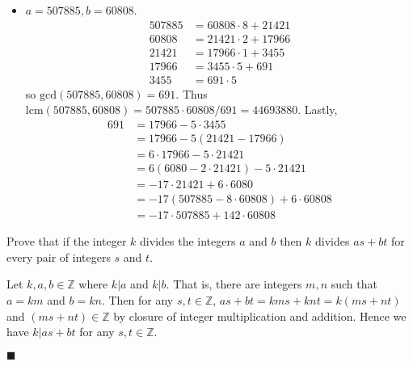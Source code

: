 \documentclass[12pt]{article}
\renewcommand{\qed}{\hfill$\blacksquare$}
\renewenvironment{proof}{\begin{addmargin}[1em]{0em}\begin{newproof}}{\end{newproof}\end{addmargin}\qed}
\newenvironment{problem}[2][Exercise]{\begin{trivlist}
\item[\hskip \labelsep {\bfseries #1}\hskip \labelsep {\bfseries #2.}]}{\end{trivlist}}
\begin{document}
\begin{problem}{0.2.1}
\begin{itemize}
    \item $a=507885,b=60808$.
    \begin{equation*}\begin{split}
    		507885 & = 60808 \cdot 8 + 21421 \\
    		60808 & = 21421 \cdot 2 + 17966 \\
    		21421 & = 17966 \cdot 1 + 3455 \\
    		17966 & = 3455 \cdot 5 + 691 \\
    		3455 & = 691 \cdot 5
    \end{split}\end{equation*} so $\text{gcd}\left(507885,60808\right) = 691$. Thus $\text{lcm}\left(507885,60808\right) = 507885\cdot 60808 / 691 = 44693880$. Lastly,
    \begin{equation*}\begin{split}
    	691 & = 17966 - 5\cdot 3455 \\
    	& = 17966 - 5\left(21421 - 17966\right) \\
    	& = 6 \cdot 17966 - 5 \cdot 21421 \\
    	& = 6\left(6080 - 2\cdot 21421\right) - 5\cdot 21421 \\
    	& = -17\cdot 21421 + 6\cdot 6080 \\
    	& = -17 \left(507885 - 8\cdot 60808\right) + 6 \cdot 60808 \\
    	& = -17 \cdot 507885 + 142\cdot 60808
    \end{split}\end{equation*}
\end{itemize}
\end{problem}






\begin{problem}{0.2.2}
Prove that if the integer $k$ divides the integers $a$ and $b$ then $k$ divides $as+bt$ for every pair of integers $s$ and $t$.
\end{problem}
\begin{proof}
Let $k,a,b\in \mathbb{Z}$ where $k|a$ and $k|b$. That is, there are integers $m,n$ such that $a=km$ and $b=kn$. Then for any $s,t\in \mathbb{Z}$, $as+bt = kms+knt=k\left(ms+nt\right)$ and $\left(ms+nt\right)\in \mathbb{Z}$ by closure of integer multiplication and addition. Hence we have $k|as+bt$ for any $s,t\in \mathbb{Z}$.
\end{proof}
\end{document}
